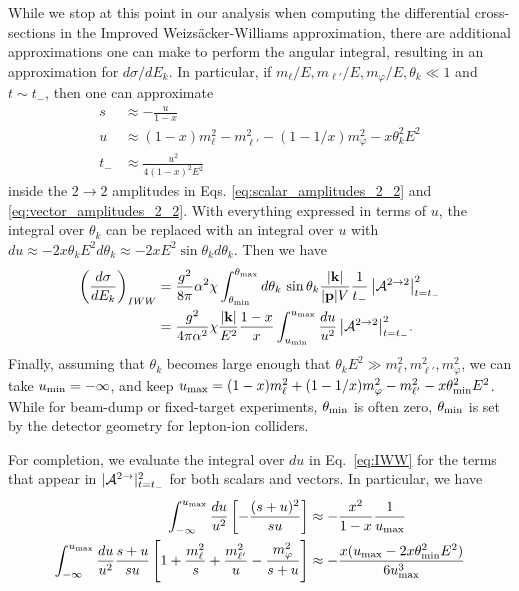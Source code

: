 While we stop at this point in our analysis when computing the differential cross-sections in the Improved Weizs\"acker-Williams approximation, there are additional approximations one can make to perform the angular integral, resulting in an approximation for $d\sigma/dE_k$. In particular, if $m_\ell/E, m_{\ell'}/E,m_\varphi/E, \theta_k \ll 1$ and $t \sim t_-$, then one can approximate
\begin{align}
    s &\approx -\frac{u}{1-x}\\
    u &\approx (1-x)m_\ell^2-m_{\ell'}^2-(1-1/x)m_\varphi^2 - x \theta_k^2E^2\\
    t_{-} &\approx \frac{u^2}{4(1-x)^2E^2}
\end{align}
inside the $2\rightarrow 2$ amplitudes in Eqs. \ref{eq:scalar_amplitudes_2_2} and \ref{eq:vector_amplitudes_2_2}. With everything expressed in terms of $u$, the integral over $\theta_k$ can be replaced with an integral over $u$ with $du \approx -2x\theta_k E^2d\theta_k \approx -2xE^2\sin{\theta_k} d\theta_k$. Then we have
\begin{align}
    \left(\frac{d\sigma}{dE_k}\right)_{\it IWW} &= \frac{g^2}{8\pi}\alpha^2 \chi \int_{\theta_{\rm min}}^{\theta_{\rm max}}{d\theta_k\,\sin{\theta_k} \frac{|{\bf k}|}{|{\bf p}|V}\frac{1}{t_-}\left|{\cal A}^{2\rightarrow 2}\right|^2_{t=t_-}}\nonumber\\
    &= \frac{g^2}{4\pi\alpha^2}\chi\frac{|{\bf k}|}{E^2}\frac{1-x}{x}\int_{u_{\rm min}}^{u_{\rm max}}{\frac{du}{u^2} \left|{\cal A}^{2\rightarrow 2}\right|^2_{t=t_-}}.\label{eq:IWW}
\end{align}
Finally, assuming that $\theta_k$ becomes large enough that $\theta_k E^2 \gg m_\ell^2,m_{\ell'}^2,m_\varphi^2$, we can take $u_{\rm min} = -\infty$, and keep $u_{\rm max} = (1-x)m_\ell^2 + (1-1/x)m_\varphi^2 - m_{\ell'}^2  - x\theta_{\rm min}^2E^2$. While for beam-dump or fixed-target experiments, $\theta_{\rm min}$ is often zero, $\theta_{\rm min}$ is set by the detector geometry for lepton-ion colliders.

For completion, we evaluate the integral over $du$ in  Eq.~\ref{eq:IWW} for the terms that appear in $|{\cal A}^{2\rightarrow }|^2_{t = t_-}$ for both scalars and vectors. In particular, we have
\begin{align}
    \int_{-\infty}^{u_{\rm max}}{\frac{du}{u^2}}\left[-\frac{(s+u)^2}{su}\right] &\approx -\frac{x^2}{1-x}\frac{1}{u_{\rm max}}\\
    \int_{-\infty}^{u_{\rm max}}{\frac{du}{u^2}}\frac{s+u}{su}\left[1+\frac{m_\ell^2}{s}+\frac{m_{\ell'}^2}{u}-\frac{m_\varphi^2}{s+u}\right] &\approx -\frac{x(u_{\rm max} - 2x\theta_{\rm min}^2 E^2)}{6u_{\rm max}^3}
\end{align}

